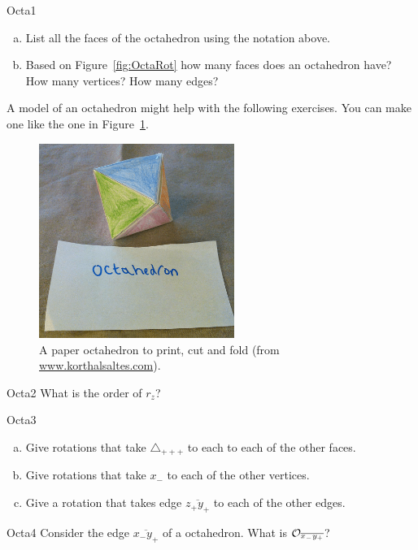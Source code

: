 \begin {exercise}{Octa1}
\begin {enumerate}[(a)]
\item List all the faces of the octahedron using the notation above.
\item Based on Figure~\ref{fig:OctaRot}  how many faces does an octahedron have? How many vertices?  How many edges?
\end{enumerate}
\end {exercise}

A model of an octahedron might help with the following exercises.  You can make one like the one in Figure~\ref{fig:OctaFold}.

\begin{figure}[ht]
\begin{center}
\includegraphics[width=2.5in]{images/OctahedronFold.png}
\caption{A paper octahedron to print, cut and fold (from \url{www.korthalsaltes.com}).}
 \label{fig:OctaFold}
\end{center}
\end{figure}

\begin{exercise}{Octa2}
What is the order of $r_z$?
\end{exercise}

\begin{exercise}{Octa3}
\begin {enumerate}[(a)]
\item Give rotations that take $\triangle _{+++}$ to each to each of the other faces.
\item Give rotations that take  $x_-$ to each of the other vertices.
\item Give a rotation that takes edge $\overline{z_+y_+}$ to each of the other edges.
\end{enumerate}
\end{exercise} 
\begin {exercise}{Octa4}
Consider the edge $\overline{x_-y_+}$ of a octahedron. What is ${\cal O}_{\overline{x_-y_+}}$?
\end {exercise}

